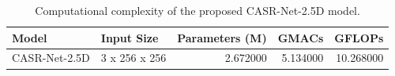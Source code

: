 \begin{table}
\caption{Computational complexity of the proposed CASR-Net-2.5D model.}
\label{tab:casrnet_25d_gflops}
\begin{tabular}{llrrr}
\toprule
Model & Input Size & Parameters (M) & GMACs & GFLOPs \\
\midrule
CASR-Net-2.5D & 3 x 256 x 256 & 2.672000 & 5.134000 & 10.268000 \\
\bottomrule
\end{tabular}
\end{table}
